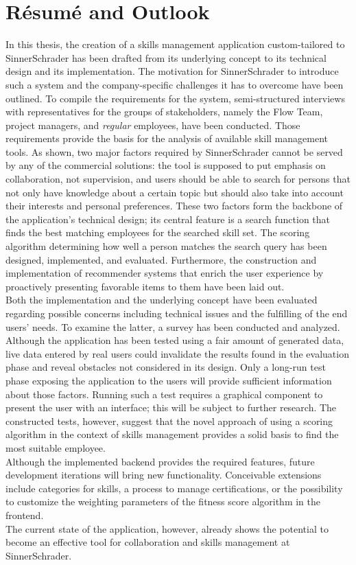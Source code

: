 \chapter{Résumé and Outlook}
In this thesis, the creation of a skills management application custom-tailored to SinnerSchrader has been drafted from its underlying concept to its technical design and its implementation. The motivation for SinnerSchrader to introduce such a system and the company-specific challenges it has to overcome have been outlined.
To compile the requirements for the system, semi-structured interviews with representatives for the groups of stakeholders, namely the Flow Team, project managers, and \textit{regular} employees, have been conducted. Those requirements provide the basis for the analysis of available skill management tools. As shown, two major factors required by SinnerSchrader cannot be served by any of the commercial solutions: the tool is supposed to put emphasis on collaboration, not supervision, and users should be able to search for persons that not only have knowledge about a certain topic but should also take into account their interests and personal preferences. These two factors form the backbone of the application's technical design; its central feature is a search function that finds the best matching employees for the searched skill set. The scoring algorithm determining how well a person matches the search query has been designed, implemented, and evaluated. Furthermore, the construction and implementation of recommender systems that enrich the user experience by proactively presenting favorable items to them have been laid out.\\
Both the implementation and the underlying concept have been evaluated regarding possible concerns including technical issues and the fulfilling of the end users' needs. To examine the latter, a survey has been conducted and analyzed.\\
Although the application has been tested using a fair amount of generated data, live data entered by real users could invalidate the results found in the evaluation phase and reveal obstacles not considered in its design. Only a long-run test phase exposing the application to the users will provide sufficient information about those factors. Running such a test requires a graphical component to present the user with an interface; this will be subject to further research.
The constructed tests, however, suggest that the novel approach of using a scoring algorithm in the context of skills management provides a solid basis to find the
most suitable employee.\\
Although the implemented backend provides the required features, future development iterations will bring new functionality. Conceivable extensions include categories for skills, a process to manage certifications, or the possibility to customize the weighting parameters of the fitness score algorithm in the frontend.\\
The current state of the application, however, already shows the potential to become an effective tool for collaboration and skills management at SinnerSchrader.
